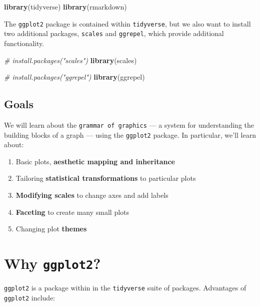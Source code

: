 \documentclass[
]{book}
\newenvironment{Shaded}{\begin{snugshade}}{\end{snugshade}}
\newcommand{\CommentTok}[1]{\textcolor[rgb]{0.56,0.35,0.01}{\textit{#1}}}
\newcommand{\KeywordTok}[1]{\textcolor[rgb]{0.13,0.29,0.53}{\textbf{#1}}}
\newcommand{\NormalTok}[1]{#1}
\providecommand{\tightlist}{%
  \setlength{\itemsep}{0pt}\setlength{\parskip}{0pt}}
\begin{document}
\begin{Shaded}
\begin{Highlighting}[]
\KeywordTok{library}\NormalTok{(tidyverse)}
\KeywordTok{library}\NormalTok{(rmarkdown)}
\end{Highlighting}
\end{Shaded}

The \texttt{ggplot2} package is contained within \texttt{tidyverse}, but we also want to
install two additional packages, \texttt{scales} and \texttt{ggrepel}, which provide
additional functionality.

\begin{Shaded}
\begin{Highlighting}[]
\CommentTok{# install.packages("scales")}
\KeywordTok{library}\NormalTok{(scales)}

\CommentTok{# install.packages("ggrepel") }
\KeywordTok{library}\NormalTok{(ggrepel)}
\end{Highlighting}
\end{Shaded}

\hypertarget{goals-2}{%
\subsection{Goals}\label{goals-2}}

We will learn about the \texttt{grammar\ of\ graphics} --- a system for understanding
the building blocks of a graph --- using the \texttt{ggplot2} package. In particular,
we'll learn about:

\begin{enumerate}
\def\labelenumi{\arabic{enumi}.}
\tightlist
\item
  Basic plots, \textbf{aesthetic mapping and inheritance}
\item
  Tailoring \textbf{statistical transformations} to particular plots
\item
  \textbf{Modifying scales} to change axes and add labels
\item
  \textbf{Faceting} to create many small plots
\item
  Changing plot \textbf{themes}
\end{enumerate}

\hypertarget{why-ggplot2}{%
\section{\texorpdfstring{Why \texttt{ggplot2}?}{Why ggplot2?}}\label{why-ggplot2}}

\texttt{ggplot2} is a package within in the \texttt{tidyverse} suite of packages. Advantages of \texttt{ggplot2} include:
\end{document}
